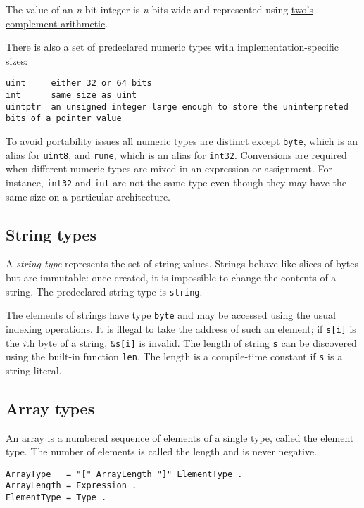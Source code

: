 The value of an \emph{n}-bit integer is \emph{n} bits wide and
represented using
\href{http://en.wikipedia.org/wiki/Two's\_complement}{two's complement
arithmetic}.

There is also a set of predeclared numeric types with
implementation-specific sizes:

\begin{Verbatim}[frame=single]
uint     either 32 or 64 bits
int      same size as uint
uintptr  an unsigned integer large enough to store the uninterpreted bits of a pointer value
\end{Verbatim}

To avoid portability issues all numeric types are distinct except
\texttt{byte}, which is an alias for \texttt{uint8}, and \texttt{rune},
which is an alias for \texttt{int32}. Conversions are required when
different numeric types are mixed in an expression or assignment. For
instance, \texttt{int32} and \texttt{int} are not the same type even
though they may have the same size on a particular architecture.

\subsection*{String types}

A \emph{string type} represents the set of string values. Strings behave
like slices of bytes but are immutable: once created, it is impossible
to change the contents of a string. The predeclared string type is
\texttt{string}.

The elements of strings have type \texttt{byte} and may be accessed
using the usual indexing operations. It is illegal
to take the address of such an element; if \texttt{s{[}i{]}} is the
\emph{i}th byte of a string, \texttt{\&s{[}i{]}} is invalid. The length
of string \texttt{s} can be discovered using the built-in function
\texttt{len}. The length is a compile-time constant if \texttt{s} is a
string literal.

\subsection*{Array types}

An array is a numbered sequence of elements of a single type, called the
element type. The number of elements is called the length and is never
negative.

\begin{Verbatim}[frame=single]
ArrayType   = "[" ArrayLength "]" ElementType .
ArrayLength = Expression .
ElementType = Type .
\end{Verbatim}

